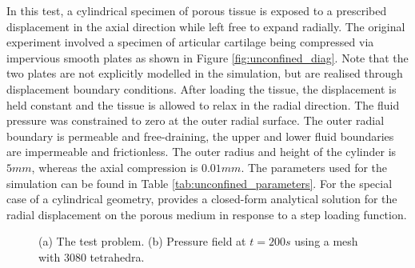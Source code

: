 In this test, a cylindrical specimen of porous tissue is exposed to a prescribed displacement in the axial direction while left free to expand radially. The original experiment involved a specimen of articular cartilage being compressed via impervious smooth plates as shown in Figure \ref{fig:unconfined_diag}. Note that the two plates are not explicitly modelled in the simulation, but are realised through displacement boundary conditions. After loading the tissue, the displacement is held constant and the tissue is allowed to relax in the radial direction. The fluid pressure was constrained to zero at the outer radial surface. The outer radial boundary is permeable and free-draining, the upper and lower fluid boundaries are impermeable and frictionless. The outer radius and height of the cylinder is $5mm$, whereas the axial compression is $0.01 mm$. The parameters used for the simulation can be found in Table \ref{tab:unconfined_parameters}. For the special case of a cylindrical geometry, \cite{armstrong1984analysis} provides a closed-form analytical solution for the radial displacement on the porous medium in response to a step loading function.

\begin{figure}[h]
  \centering
  \label{fig:animals}
\caption{ (a) The test problem. (b) Pressure field at $t=200s$ using a mesh with 3080 tetrahedra.}
\end{figure}


\begin{table}[h]
\begin{center}
\end{center}
\caption{Parameters used for the unconfined compression test problem.} \label{tab:unconfined_parameters}
\end{table}


